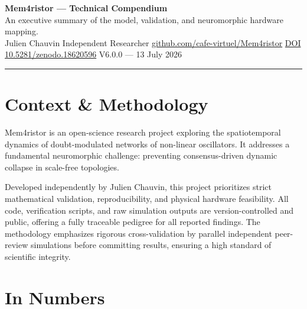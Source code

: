 \documentclass[11pt, a4paper]{article}
\begin{document}
\begin{center}
  {\LARGE\bfseries\color{accent} Mem4ristor — Technical Compendium}\\[0.4em]
  {\large An executive summary of the model, validation, and neuromorphic hardware mapping.}\\[0.6em]
  {\small\color{muted}
    Julien Chauvin \quad \textbar \quad
    Independent Researcher \quad \textbar \quad
    \href{https://github.com/cafe-virtuel/Mem4ristor}{github.com/cafe-virtuel/Mem4ristor} \quad \textbar \quad
    \href{https://doi.org/10.5281/zenodo.18620596}{DOI 10.5281/zenodo.18620596} \quad \textbar \quad
    V6.0.0 — 13 July 2026
  }
\end{center}

\vspace{0.3em}
\color{rulecol}\rule{\linewidth}{1pt}\color{black}
\vspace{0.5em}

\section{Context \& Methodology}

Mem4ristor is an open-science research project exploring the spatiotemporal dynamics of doubt-modulated networks of non-linear oscillators. It addresses a fundamental neuromorphic challenge: preventing consensus-driven dynamic collapse in scale-free topologies.

Developed independently by Julien Chauvin, this project prioritizes strict mathematical validation, reproducibility, and physical hardware feasibility. All code, verification scripts, and raw simulation outputs are version-controlled and public, offering a fully traceable pedigree for all reported findings. The methodology emphasizes rigorous cross-validation by parallel independent peer-review simulations before committing results, ensuring a high standard of scientific integrity.

\section{In Numbers}
\end{document}
